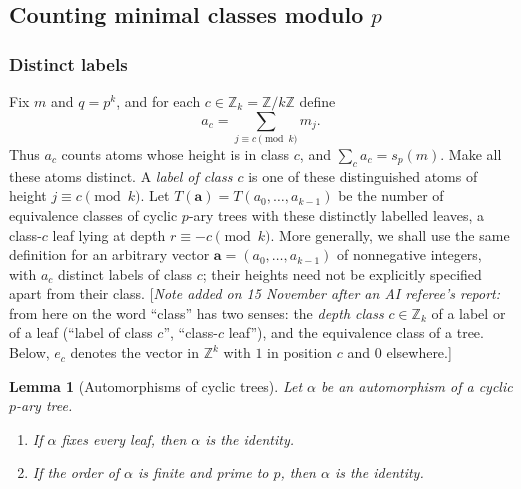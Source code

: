 \documentclass[11pt]{article}
\newtheorem{lemma}[theorem]{Lemma}
\theoremstyle{definition}
\theoremstyle{remark}
\numberwithin{equation}{section}
\numberwithin{figure}{section}
\newcommand{\Z}{\mathbb Z}
\newcommand{\refnote}[1]{[\emph{Note added on 15 November after an AI referee's report:} #1]}
\begin{document}
\subsection{Counting minimal classes modulo \texorpdfstring{$p$}{p}}\label{main:sec:count}
\subsubsection{Distinct labels}
Fix $m$ and $q=p^k$, and for each $c\in\Z_k=\Z/k\Z$ define
\[
 a_c=\sum_{j\equiv c\pmod k}m_j.
\]
Thus $a_c$ counts atoms whose height is in class $c$, and $\sum_ca_c=s_p(m)$.  Make all these atoms distinct.  A \emph{label of class $c$} is one of these distinguished atoms of height $j\equiv c\pmod k$.  Let $T(\mathbf a)=T(a_0,\ldots,a_{k-1})$ be the number of equivalence classes of cyclic $p$-ary trees with these distinctly labelled leaves, a class-$c$ leaf lying at depth $r\equiv-c\pmod k$.  More generally, we shall use the same definition for an arbitrary vector $\mathbf a=(a_0,\ldots,a_{k-1})$ of nonnegative integers, with $a_c$ distinct labels of class $c$; their heights need not be explicitly specified apart from their class.
\refnote{from here on the word ``class'' has two senses: the \emph{depth class} $c\in\Z_k$ of a label or of a leaf (``label of class $c$'', ``class-$c$ leaf''), and the equivalence class of a tree.  Below, $e_c$ denotes the vector in $\Z^k$ with $1$ in position $c$ and $0$ elsewhere.}
\begin{lemma}[Automorphisms of cyclic trees]\label{main:lem:aut-order}
Let $\alpha$ be an automorphism of a cyclic $p$-ary tree.
\begin{enumerate}
\item[\textup{(i)}] If $\alpha$ fixes every leaf, then $\alpha$ is the identity.
\item[\textup{(ii)}] If the order of $\alpha$ is finite and prime to $p$, then $\alpha$ is the identity.
\end{enumerate}
\end{lemma}
\end{document}
